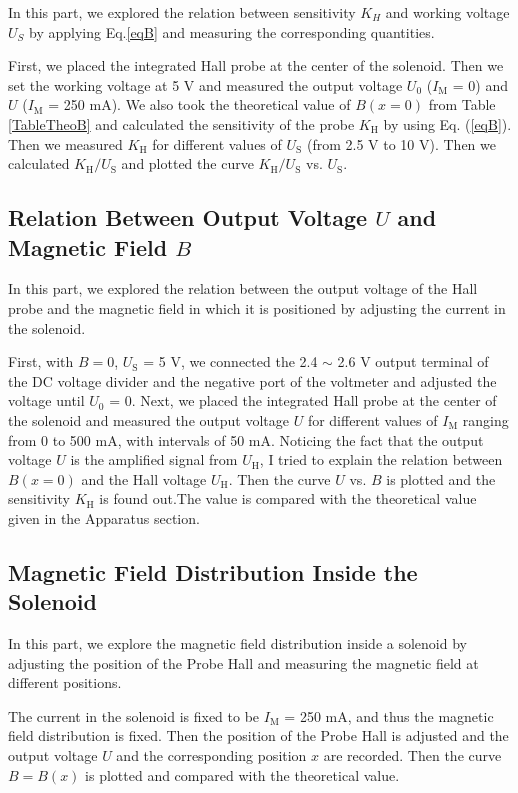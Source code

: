 \documentclass{article}
\begin{document}
In this part, we explored the relation between sensitivity $K_{H}$ and working voltage $U_{S}$ by applying Eq.\eqref{eqB} and measuring the corresponding quantities. 

First, we placed the integrated Hall probe at the center of the solenoid. Then we set the working voltage at 5 V and measured the output voltage $U_0$ ($I_\text{M}$ = 0) and $U$ ($I_\text{M}$ = 250 mA). We also took the theoretical value of $B(x = 0)$ from Table \ref{TableTheoB} and calculated the sensitivity of the probe $K_\text{H}$ by using Eq. (\ref{eqB}).
Then we measured $K_\text{H}$ for different values of $U_\text{S}$ (from 2.5 V to 10 V). Then we calculated $K_\text{H}/U_\text{S}$ and plotted the curve $K_\text{H}/U_\text{S}$ vs. $U_\text{S}$.


	\subsection{Relation Between Output Voltage $U$ and Magnetic Field $B$}

In this part, we explored the relation between the output voltage of the Hall probe and the magnetic field in which it is positioned by adjusting the current in the solenoid.

First, with $B=0$, $U_\text{S}$ = 5 V, we connected the 2.4 $\sim$ 2.6 V output terminal of the DC voltage divider and the negative port of the voltmeter and adjusted the voltage until $U_0$ = 0.
Next, we placed the integrated Hall probe at the center of the solenoid and measured the output voltage $U$ for different values of $I_\text{M}$ ranging from 0 to 500 mA, with intervals of 50 mA.
Noticing the fact that the output voltage $U$ is the amplified signal from $U_\text{H}$, I tried to explain the relation between $B(x = 0)$ and the Hall voltage $U_\text{H}$.
Then the curve $U$ vs. $B$ is plotted and the sensitivity $K_\text{H}$ is found out.The value is compared with the theoretical value given in the Apparatus section.

	\subsection{Magnetic Field Distribution Inside the Solenoid}

In this part, we explore the magnetic field distribution inside a solenoid by adjusting the position of the Probe Hall and measuring the magnetic field at different positions.

The current in the solenoid is fixed to be $I_\text{M}$ = 250 mA, and thus the magnetic field distribution is fixed. Then the position of the Probe Hall is adjusted and the output voltage $U$ and the corresponding position $x$ are recorded.
Then the curve $B = B(x)$ is plotted and compared with the theoretical value.
\end{document}
